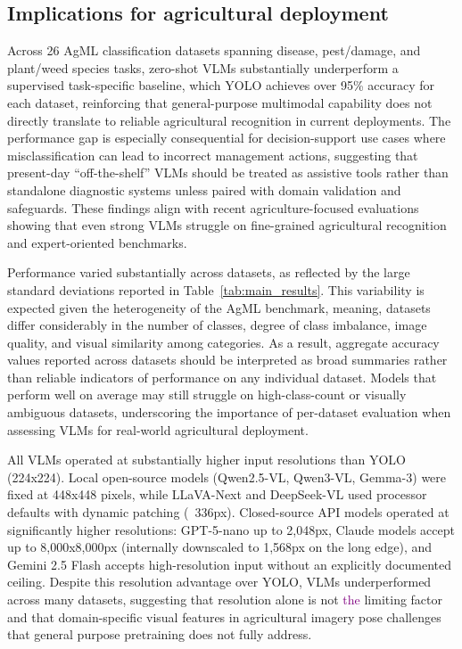 \documentclass[10pt,letterpaper]{article}
\renewcommand{\hl}[1]{\textcolor{purple}{#1}}
\begin{document}
\subsection{Implications for agricultural deployment}
Across 26 AgML classification datasets spanning disease, pest/damage, and plant/weed species tasks, zero-shot VLMs substantially underperform a supervised task-specific baseline, which YOLO achieves over 95\% accuracy for each dataset, reinforcing that general-purpose multimodal capability does not directly translate to reliable agricultural recognition in current deployments. The performance gap is especially consequential for decision-support use cases where misclassification can lead to incorrect management actions, suggesting that present-day “off-the-shelf” VLMs should be treated as assistive tools rather than standalone diagnostic systems unless paired with domain validation and safeguards. These findings align with recent agriculture-focused evaluations showing that even strong VLMs struggle on fine-grained agricultural recognition and expert-oriented benchmarks.

Performance varied substantially across datasets, as reflected by the large standard deviations reported in Table~\ref{tab:main_results}. This variability is expected given the heterogeneity of the AgML benchmark, meaning, datasets differ considerably in the number of classes, degree of class imbalance, image quality, and visual similarity among categories. As a result, aggregate accuracy values reported across datasets should be interpreted as broad summaries rather than reliable indicators of performance on any individual dataset. Models that perform well on average may still struggle on high-class-count or visually ambiguous datasets, underscoring the importance of per-dataset evaluation when assessing VLMs for real-world agricultural deployment.

All VLMs operated at substantially higher input resolutions than YOLO (224x224). Local open-source models (Qwen2.5-VL, Qwen3-VL, Gemma-3) were fixed at 448x448 pixels, while LLaVA-Next and DeepSeek-VL used processor defaults with dynamic patching (~336px). Closed-source API models operated at significantly higher resolutions: GPT-5-nano up to 2,048px, Claude models accept up to 8,000x8,000px (internally downscaled to 1,568px on the long edge), and Gemini 2.5 Flash accepts high-resolution input without an explicitly documented ceiling. Despite this resolution advantage over YOLO, VLMs underperformed across many datasets, suggesting that resolution alone is not \hl{the} limiting factor and that domain-specific visual features in agricultural imagery pose challenges that general purpose pretraining does not fully address.
\end{document}
